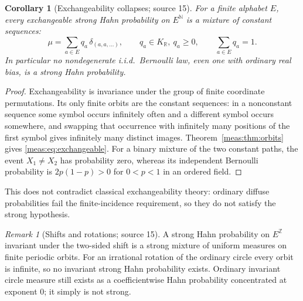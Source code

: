 \documentclass[11pt]{article}
\numberwithin{equation}{section}
\newtheorem{corollary}[theorem]{Corollary}
\theoremstyle{definition}
\theoremstyle{remark}
\newtheorem{remark}[theorem]{Remark}
\newcommand{\R}{\mathbb R}
\newcommand{\N}{\mathbb N}
\newcommand{\Z}{\mathbb Z}
\newcommand{\KR}{K_{\R}}
\begin{document}
\begin{corollary}[Exchangeability collapses; source 15]
\label{meas:cor:exchangeable}
For a finite alphabet $E$, every exchangeable strong Hahn probability on
$E^{\N}$ is a mixture of constant sequences:
\begin{equation}\label{meas:eq:exchangeable}
 \mu=\sum_{a\in E}q_a\,\delta_{(a,a,\ldots)},\qquad
 q_a\in\KR,\ q_a\ge0,\qquad\sum_{a\in E}q_a=1.
\end{equation}
In particular no nondegenerate i.i.d.\ Bernoulli law, even one with ordinary
real bias, is a strong Hahn probability.
\end{corollary}
\begin{proof}
Exchangeability is invariance under the group of finite coordinate
permutations. Its only finite orbits are the constant sequences: in a
nonconstant sequence some symbol occurs infinitely often and a different symbol
occurs somewhere, and swapping that occurrence with infinitely many positions
of the first symbol gives infinitely many distinct images.
Theorem~\ref{meas:thm:orbits} gives \eqref{meas:eq:exchangeable}. For a binary
mixture of the two constant paths, the event $X_1\ne X_2$ has probability zero,
whereas its independent Bernoulli probability is $2p(1-p)>0$ for $0<p<1$ in an
ordered field.
\end{proof}

This does not contradict classical exchangeability theory: ordinary diffuse
probabilities fail the finite-incidence requirement, so they do not satisfy
the strong hypothesis.

\begin{remark}[Shifts and rotations; source 15]\label{meas:rem:shift-rotation}
A strong Hahn probability on $E^{\Z}$ invariant under the two-sided shift is a
strong mixture of uniform measures on finite periodic orbits. For an
irrational rotation of the ordinary circle every orbit is infinite, so no
invariant strong Hahn probability exists. Ordinary invariant circle measure
still exists as a coefficientwise Hahn probability concentrated at exponent
$0$; it simply is not strong.
\end{remark}
\end{document}
